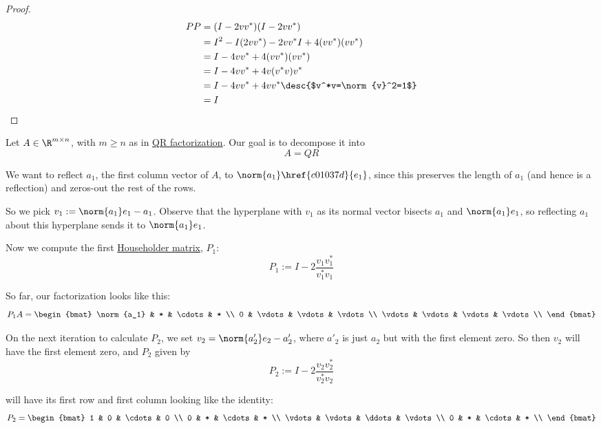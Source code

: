 \begin{proof}
  \begin{align*}
    PP &=(I-2vv^*)(I-2vv^*)                       \\
       &=I^2-I(2vv^*)-2vv^*I+4(vv^*)(vv^*)        \\
       &=I-4vv^*+4(vv^*)(vv^*)                    \\
       &=I-4vv^*+4v(v^*v)v^*                      \\
       &=I-4vv^*+4vv^* \desc{$v^*v=\norm{v}^2=1$} \\
       &=I
  \end{align*}
\end{proof}

\label{a77c7b1}

Let $A\in\R^{m\times n}$, with $m\geq n$ as in \href{c465f7c}{QR
factorization}. Our goal is to decompose it into
$$
  A=QR
$$

We want to reflect $a_1$, the first column vector of $A$, to
$\norm{a_1}\href{c01037d}{e_1}$, since this preserves the length of $a_1$ (and
hence is a reflection) and zeros-out the rest of the rows.

So we pick $v_1:=\norm{a_1}e_1-a_1$. Observe that the hyperplane with $v_1$ as
its normal vector bisects $a_1$ and $\norm{a_1}e_1$, so reflecting $a_1$ about
this hyperplane sends it to $\norm{a_1}e_1$.

Now we compute the first \href{ae0f3b4}{Householder matrix}, $P_1$:
$$
  P_1:=I-2\frac{v_1v_1^*}{v_1^*v_1}
$$

So far, our factorization looks like this:
$$
  P_1A=\begin{bmat}
    \norm{a_1} & *      & \cdots & *      \\
    0          & \vdots & \vdots & \vdots \\
    \vdots     & \vdots & \vdots & \vdots \\
  \end{bmat}
$$

On the next iteration to calculate $P_2$, we set $v_2=\norm{a'_2}e_2-a'_2$,
where $a'_2$ is just $a_2$ but with the first element zero. So then $v_2$ will
have the first element zero, and $P_2$ given by
$$
  P_2:=I-2\frac{v_2v_2^*}{v_2^*v_2}
$$

will have its first row and first column looking like the identity:
$$
  P_2=\begin{bmat}
    1      & 0      & \cdots & 0      \\
    0      & *      & \cdots & *      \\
    \vdots & \vdots & \ddots & \vdots \\
    0      & *      & \cdots & *      \\
  \end{bmat}
$$

